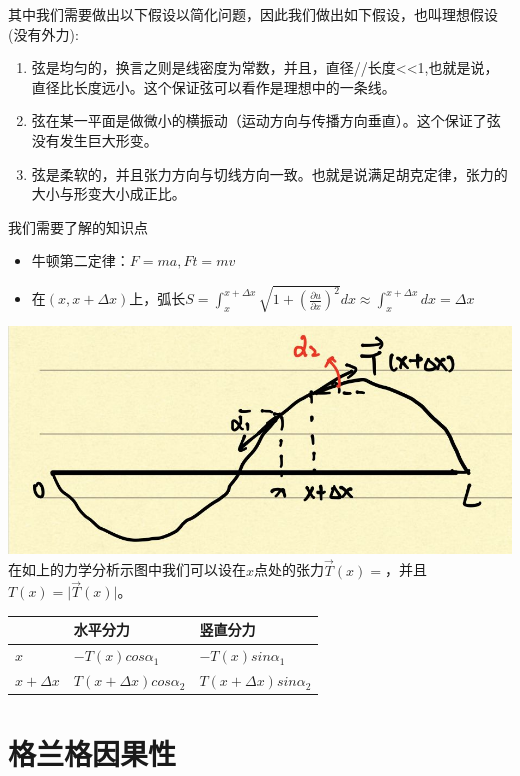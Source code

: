 \documentclass[
]{book}
\providecommand{\tightlist}{%
  \setlength{\itemsep}{0pt}\setlength{\parskip}{0pt}}
\begin{document}
其中我们需要做出以下假设以简化问题，因此我们做出如下假设，也叫理想假设(没有外力):

\begin{enumerate}
\def\labelenumi{\arabic{enumi}.}
\tightlist
\item
  弦是均匀的，换言之则是线密度为常数，并且，直径//长度\textless\textless1,也就是说，直径比长度远小。这个保证弦可以看作是理想中的一条线。
\item
  弦在某一平面是做微小的横振动（运动方向与传播方向垂直）。这个保证了弦没有发生巨大形变。
\item
  弦是柔软的，并且张力方向与切线方向一致。也就是说满足胡克定律，张力的大小与形变大小成正比。
\end{enumerate}

我们需要了解的知识点

\begin{itemize}
\tightlist
\item
  牛顿第二定律：\(F=ma,Ft=mv\)
\item
  在\((x,x + \Delta x)\)上，弧长\(S = \int_{x}^{x+\Delta x} \sqrt{1+(\frac{\partial u}{\partial x})^2} dx \approx \int_{x}^{x+\Delta x} dx = \Delta x\)
\end{itemize}

\includegraphics{t1.jpg}
在如上的力学分析示图中我们可以设在\(x\)点处的张力\(\vec{T}(x)=\)，并且\(T(x)= \lvert\vec{T}(x) \lvert\)。

\begin{longtable}[]{@{}lll@{}}
\toprule
& 水平分力 & 竖直分力 \\
\midrule
\endhead
\(x\) & \(-T(x)cos\alpha_1\) & \(-T(x)sin\alpha_1\) \\
\(x+\Delta x\) & \(T(x+\Delta x)cos\alpha_2\) & \(T(x+\Delta x)sin\alpha_2\) \\
\bottomrule
\end{longtable}

\hypertarget{causal}{%
\chapter{格兰格因果性}\label{causal}}

\printbibliography
\end{document}
